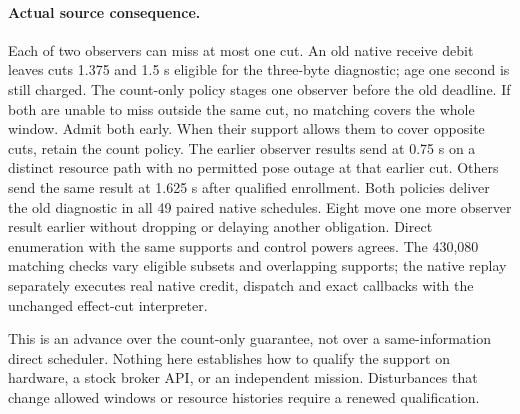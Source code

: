 \documentclass{article}
\begin{document}
\paragraph{Actual source consequence.}
Each of two observers can miss at most one cut.
An old native receive debit leaves cuts 1.375 and 1.5 s eligible
for the three-byte diagnostic; age one second is still charged.
The count-only policy stages one observer before the old deadline.
If both are unable to miss outside the same cut, no matching
covers the whole window. Admit both early. When their support
allows them to cover opposite cuts, retain the count policy.
The earlier observer results send at 0.75 s on a distinct resource
path with no permitted pose outage at that earlier cut. Others send
the same result at 1.625 s after qualified enrollment. Both policies
deliver the old diagnostic in all 49 paired native schedules.
Eight move one more observer result earlier without dropping
or delaying another obligation. Direct enumeration with the same
supports and control powers agrees. The 430,080 matching checks
vary eligible subsets and overlapping supports; the native replay
separately executes real native credit, dispatch and exact callbacks
with the unchanged effect-cut interpreter.

This is an advance over the count-only guarantee, not over a
same-information direct scheduler. Nothing here establishes
how to qualify the support on hardware, a stock broker API,
or an independent mission. Disturbances that change allowed
windows or resource histories require a renewed qualification.
\end{document}
